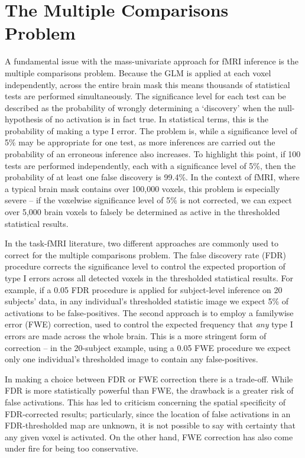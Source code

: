 \section{The Multiple Comparisons Problem}

A fundamental issue with the mass-univariate approach for fMRI inference is the multiple comparisons problem. Because the GLM is applied at each voxel independently, across the entire brain mask this means thousands of statistical tests are performed simultaneously. The significance level for each test can be described as the probability of wrongly determining a `discovery' when the null-hypothesis of no activation is in fact true. In statistical terms, this is the probability of making a type I error. The problem is, while a significance level of 5\% may be appropriate for one test, as more inferences are carried out the probability of an erroneous inference also increases. To highlight this point, if 100 tests are performed independently, each with a significance level of 5\%, then the probability of at least one false discovery is 99.4\%. In the context of fMRI, where a typical brain mask contains over 100,000 voxels, this problem is especially severe -- if the voxelwise significance level of 5\% is not corrected, we can expect over 5,000 brain voxels to falsely be determined as active in the thresholded statistical results.

In the task-fMRI literature, two different approaches are commonly used to correct for the multiple comparisons problem. The false discovery rate (FDR) procedure corrects the significance level to control the expected proportion of type I errors across all detected voxels in the thresholded statistical results. For example, if a 0.05 FDR procedure is applied for subject-level inference on 20 subjects' data, in any individual's thresholded statistic image we expect 5\% of activations to be false-positives. The second approach is to employ a familywise error (FWE) correction, used to control the expected frequency that \textit{any} type I errors are made across the whole brain. This is a more stringent form of correction -- in the 20-subject example, using a 0.05 FWE procedure we expect only one individual's thresholded image to contain any false-positives. 

In making a choice between FDR or FWE correction there is a trade-off. While FDR is more statistically powerful than FWE, the drawback is a greater risk of false activations. This has led to criticism concerning the spatial specificity of FDR-corrected results; particularly, since the location of false activations in an FDR-thresholded map are unknown, it is not possible to say with certainty that any given voxel is activated. On the other hand, FWE correction has also come under fire for being too conservative.

